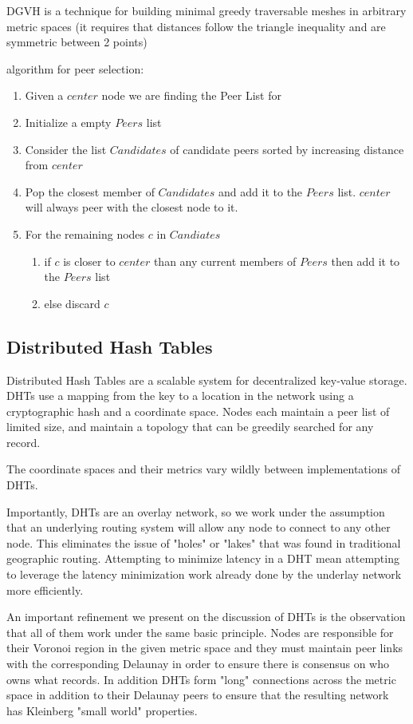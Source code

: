 DGVH\cite{dgvh} is a technique for building minimal greedy traversable meshes in arbitrary metric spaces (it requires that distances follow the triangle inequality and are symmetric between 2 points)

algorithm for peer selection:
\begin{enumerate}
\item Given a $center$ node we are finding the Peer List for
\item Initialize a empty $Peers$ list
\item Consider the list $Candidates$ of candidate peers sorted by increasing distance from $center$
\item Pop the closest member of $Candidates$ and add it to the $Peers$ list. $center$ will always peer with the closest node to it.
\item For the remaining nodes $c$ in $Candiates$
\begin{enumerate}
	\item if $c$ is closer to $center$ than any current members of $Peers$ then add it to the $Peers$ list
    \item else discard $c$
\end{enumerate}
\end{enumerate}


\subsection{Distributed Hash Tables}

Distributed Hash Tables are a scalable system for decentralized key-value storage.
DHTs use a mapping from the key to a location in the network using a cryptographic hash and a coordinate space.
Nodes each maintain a peer list of limited size, and maintain a topology that can be greedily searched for any record.

The coordinate spaces and their metrics vary wildly between implementations of DHTs.

Importantly, DHTs are an overlay network, so we work under the assumption that an underlying routing system will allow any node to connect to any other node.
This eliminates the issue of "holes" or "lakes" that was found in traditional geographic routing.
Attempting to minimize latency in a DHT mean attempting to leverage the latency minimization work already done by the underlay network more efficiently.

An important refinement we present on the discussion of DHTs is the observation that all of them work under the same basic principle. 
Nodes are responsible for their Voronoi region in the given metric space and they must maintain peer links with the corresponding Delaunay in order to ensure there is consensus on who owns what records.
In addition DHTs form "long" connections across the metric space in addition to their Delaunay peers to ensure that the resulting network has Kleinberg "small world"\cite{kleinberg2000navigation} properties.

